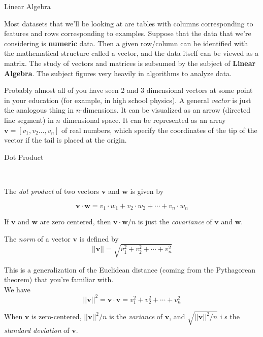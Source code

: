 \documentclass{article}
\begin{document}
\centerline{\sc \large Linear Algebra}
\vspace{2 pc}

Most datasets that we'll be looking at are tables with columns corresponding to features and rows corresponding to examples. Suppose that the data that we're considering is \textbf{numeric} data. Then a given row/column can be identified with the mathematical structure called a vector, and the data itself can be viewed as a matrix. The study of vectors and matrices is subsumed by the subject of \textbf{Linear Algebra}. The subject figures very heavily in algorithms to analyze data.

Probably almost all of you have seen 2 and 3 dimensional vectors at some point in your education (for example, in high school physics). A general \emph{vector} is just the analogous thing in $n$-dimensions. It can be visualized as an arrow (directed line segment) in $n$ dimensional space. It can be represented as an array $\textbf{v} = [v_1, v_2 ..., v_n ]$ of real numbers, which specify the coordinates of the tip of the vector if the tail is placed at the origin.\\

\centerline{\sc \large Dot Product}\


\noindent The \emph{dot product} of two vectors $\textbf{v}$ and $\textbf{w}$ is given by 

\[  \textbf{v} \cdot \textbf{w} = v_1 \cdot w_1 + v_2 \cdot w_2 + \cdots + v_n \cdot w_n \] 

\noindent If $\textbf{v}$ and $\textbf{w}$ are zero centered, then $\textbf{v} \cdot \textbf{w} /n $ is just the \emph{covariance} of $\textbf{v}$ and $\textbf{w}$. 


\noindent The \emph{norm} of a vector $\textbf{v}$ is defined by \\
 
\[  ||\textbf{v}||  = \sqrt{v_{1}^2 + v_{2}^2+ \cdots + v_{n}^2} \]

This is a generalization of the Euclidean distance (coming from the Pythagorean theorem) that you're familiar with. \\

We have\\
\[  ||\textbf{v}||^2 = \textbf{v} \cdot \textbf{v} = v_{1}^2 + v_{2}^2+ \cdots + v_{n}^2 \]


When $\textbf{v}$ is zero-centered, $||\textbf{v}||^2 / n$  is the \emph{variance} of $\textbf{v}$, and $\sqrt{||\textbf{v}||^2 / n}$ i s the \emph{standard deviation} of $\textbf{v}$.\\
\end{document}
